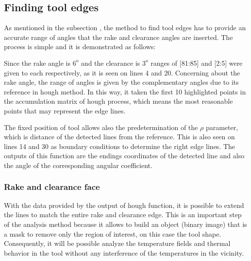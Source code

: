 	\subsection{Finding tool edges}

	As mentioned in the subsection , the method to find tool edges has to provide an accurate range of angles that the rake and clearance angles are inserted. The process is simple and it is demonstrated as follows:

	

	Since the rake angle is $6^{o}$ and the clearance is $3^{o}$ ranges of [81:85] and [2:5] were given to each respectively, as it is seen on lines 4 and 20. Concerning about the rake angle, the range of angles is given by the complementary angles due to its reference in hough method. In this way, it taken the first 10 highlighted points in the accumulation matrix of hough process, which means the most reasonable points that may represent the edge lines.

	The fixed position of tool allows also the predetermination of the $\rho$ parameter, which is distance of the detected lines from the reference. This is also seen on lines 14 and 30 as boundary conditions to determine the right edge lines. The outputs of this function are the endings coordinates of the detected line and also the angle of the corresponding angular coefficient. 


		\subsubsection{Rake and clearance face}

		With the data provided by the output of hough function, it is possible to extend the lines to match the entire rake and clearance edge. This is an important step of the analysis method because it allows to build an object (binary image) that is a mask to remove only the region of interest, on this case the tool shape. Consequently, it will be possible analyze the temperature fields and thermal behavior in the tool without any interference of the temperatures in the vicinity.

